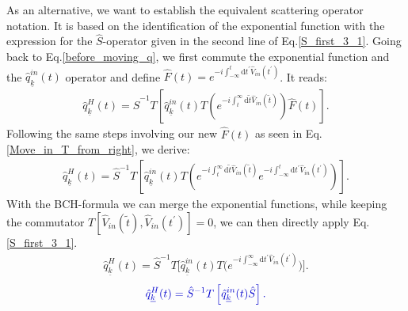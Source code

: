 \documentclass[
12pt, %
english, %
singlespacing, %
headsepline, %
]{MastersDoctoralThesis} %
\begin{document}
 As an alternative, we want to establish the equivalent scattering operator notation. It is based on the identification of the exponential function with the expression for the $ \hat{S} $-operator given in the second line of Eq.\enskip\eqref{S_first_3_1}. 
Going back to Eq.\enskip\eqref{before_moving_q}, we first commute the exponential function and the $ \hat{q}^{in}_{\underline{k}}(t) $ operator and define  $\hat{F}(t)=e^{-i\int_{-\infty}^{t}\mathrm{d}t^{\prime} \hat{V}_{in}(t^{\prime})}$. It reads:
\begin{equation}\label{after_moving_q}
\begin{split}
\hat{q}^{H}_{\underline{k}}(t)
=
\hat{S}^{-1} 
T
\left[ 
\hat{q}^{in}_{\underline{k}}(t)
T
\left( 
 e^{-i\int_{t}^{\infty}\mathrm{d}\tilde{t} \hat{V}_{in}(\tilde{t})}
\right)
\hat{F}(t)
\right] 
	.
\end{split}
\end{equation}
Following the same steps involving our new $ \hat{F}(t) $ as seen in Eq.\enskip\eqref{Move_in_T_from_right}, we derive:
\begin{equation}
\begin{split}
\hat{q}^{H}_{\underline{k}}(t)
=
\hat{S}^{-1} 
T
\left[
\hat{q}^{in}_{\underline{k}}(t)
T
\left( 
 e^{-i\int_{t}^{\infty}\mathrm{d}\tilde{t} \hat{V}_{in}(\tilde{t})}
 e^{-i\int_{-\infty}^{t}\mathrm{d}t^{\prime} \hat{V}_{in}(t^{\prime})}
\right) 
\right] 
.
\end{split}
\end{equation}
With the BCH-formula we can merge the exponential functions, while keeping the commutator $ T[\hat{V}_{in}(\tilde{t}),\hat{V}_{in}(t^{\prime})] = 0$, we can then directly apply Eq.\enskip\eqref{S_first_3_1}.
\begin{equation}
\begin{split}
\hat{q}^{H}_{\underline{k}}(t)
=
\hat{S}^{-1} 
T
\Big[
\hat{q}^{in}_{\underline{k}}(t)
T
\Big( 
 e^{-i\int_{-\infty}^{\infty}\mathrm{d}t^{\prime} \hat{V}_{in}(t^{\prime})}
\Big) 
\Big] 
.
\end{split}
\end{equation}
 \begin{equation}\label{Gell_Mann-Low_for_one_Q}
\begin{split}
 \textcolor[RGB]{0,0,204}{
\hat{q}^{H}_{\underline{k}}(t)
=
\hat{S}^{-1} 
T
\left[ 
\hat{q}^{in}_{\underline{k}}(t)
\hat{S}
\right]
.
}
\end{split}
\end{equation}
\end{document}
